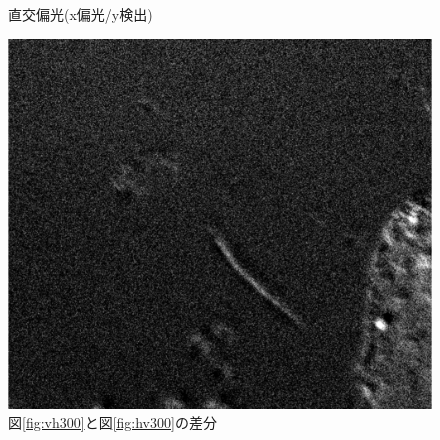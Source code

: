 \documentclass[11pt,a4paper]{jsarticle}
\begin{document}
\begin{figure}[htbp]
\begin{minipage}{0.333\hsize}
\begin{center}
  \end{center}
  \caption{直交偏光(x偏光/y検出)}
  \label{fig:hv300}
 \end{minipage}
 \begin{minipage}{0.333\hsize}
  \begin{center}
   \includegraphics[width=\hsize]{vh300_subtractedby_hv300.eps}
  \end{center}
  \caption{図\ref{fig:vh300}と図\ref{fig:hv300}の差分}
  \label{fig:vh300_subtractedby_hv300}
 \end{minipage}
\end{figure}
\end{document}
